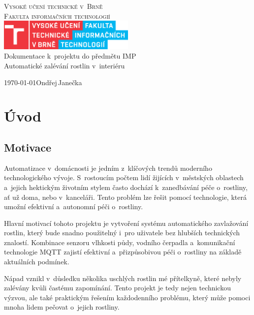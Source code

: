 \documentclass[a4paper, 11pt]{article}
\begin{document}
\begin{titlepage}
	\begin{center}
		{\Huge \textsc{Vysoké učení technické v~Brně}\\}
		{\huge \textsc{Fakulta informačních technologií}\\}
        \includegraphics[width=0.5\textwidth]{img/FIT_barevne_CMYK_CZ.eps}\\
		{\LARGE Dokumentace k~projektu do předmětu IMP\\}
		{\Huge Automatické zalévání rostlin v~interiéru\\}
	\end{center}
	{\Large \today \hfill Ondřej\,Janečka}
\end{titlepage}

\newpage
\section{Úvod}

\subsection{Motivace}
Automatizace v~domácnosti je jedním z~klíčových trendů moderního technologického vývoje. S~rostoucím počtem lidí žijících v~městských oblastech 
a~jejich hektickým životním stylem často dochází k~zanedbávání péče o~rostliny, ať už doma, nebo v~kanceláři. Tento problém lze řešit pomocí technologie, 
která umožní efektivní a~autonomní péči o~rostliny.

Hlavní motivací tohoto projektu je vytvoření systému automatického zavlažování rostlin, který bude snadno použitelný i~pro uživatele bez hlubších technických znalostí. 
Kombinace senzoru vlhkosti půdy, vodního čerpadla a~komunikační technologie MQTT zajistí efektivní a~přizpůsobivou péči o~rostliny na základě aktuálních podmínek.

Nápad vznikl v~důsledku několika uschlých rostlin mé přítelkyně, které nebyly zalévány kvůli častému zapomínání. Tento projekt je tedy nejen technickou výzvou, 
ale také praktickým řešením každodenního problému, který může pomoci mnoha lidem pečovat o~jejich rostliny.
\end{document}
